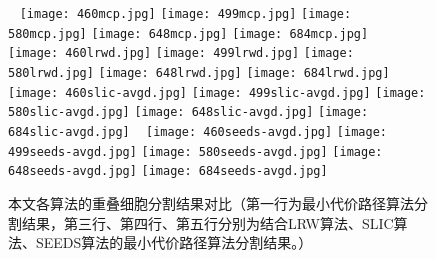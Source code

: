 \documentclass[nomlist,masters]{seuthesix}
\begin{document}
\begin{figure}[H]
\centering 
\texttt{[image: 460mcp.jpg]}
\hspace{0.001\textwidth}
\texttt{[image: 499mcp.jpg]}
\hspace{0.001\textwidth}
\texttt{[image: 580mcp.jpg]}
\hspace{0.001\textwidth}
\texttt{[image: 648mcp.jpg]}
\hspace{0.001\textwidth}
\texttt{[image: 684mcp.jpg]}
\vfill
\vspace{6pt}
\centering 
\texttt{[image: 460lrwd.jpg]}
\hspace{0.001\textwidth}
\texttt{[image: 499lrwd.jpg]}
\hspace{0.001\textwidth}
\texttt{[image: 580lrwd.jpg]}
\hspace{0.001\textwidth}
\texttt{[image: 648lrwd.jpg]}
\hspace{0.001\textwidth}
\texttt{[image: 684lrwd.jpg]}
\vfill
\vspace{6pt}
\centering 
\texttt{[image: 460slic-avgd.jpg]}
\hspace{0.001\textwidth}
\texttt{[image: 499slic-avgd.jpg]}
\hspace{0.001\textwidth}
\texttt{[image: 580slic-avgd.jpg]}
\hspace{0.001\textwidth}
\texttt{[image: 648slic-avgd.jpg]}
\hspace{0.001\textwidth}
\texttt{[image: 684slic-avgd.jpg]}
\vfill
\vspace{6pt}
\centering 
\texttt{[image: 460seeds-avgd.jpg]}
\hspace{0.001\textwidth}
\texttt{[image: 499seeds-avgd.jpg]}
\hspace{0.001\textwidth}
\texttt{[image: 580seeds-avgd.jpg]}
\hspace{0.001\textwidth}
\texttt{[image: 648seeds-avgd.jpg]}
\hspace{0.001\textwidth}
\texttt{[image: 684seeds-avgd.jpg]}
\caption{本文各算法的重叠细胞分割结果对比（第一行为最小代价路径算法分割结果，第三行、第四行、第五行分别为结合LRW算法、SLIC算法、SEEDS算法的最小代价路径算法分割结果。）}
\label{mcptosp}
\end{figure}
\end{document}
